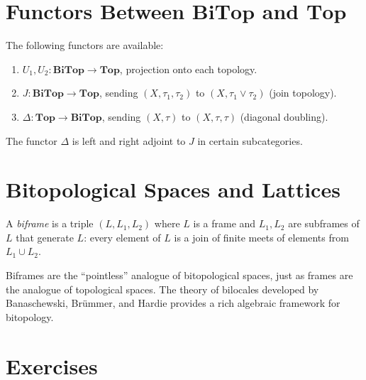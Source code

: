 \section{Functors Between $\mathbf{BiTop}$ and $\mathbf{Top}$}

\begin{proposition}
The following functors are available:
\begin{enumerate}
  \item $U_1, U_2\colon \mathbf{BiTop} \to \mathbf{Top}$, projection onto each topology.
  \item $J\colon \mathbf{BiTop} \to \mathbf{Top}$, sending $(X,\tau_1,\tau_2)$ to
    $(X, \tau_1 \vee \tau_2)$ (join topology).
  \item $\Delta\colon \mathbf{Top} \to \mathbf{BiTop}$, sending $(X,\tau)$ to
    $(X,\tau,\tau)$ (diagonal doubling).
\end{enumerate}
The functor $\Delta$ is left and right adjoint to $J$ in certain subcategories.
\end{proposition}

\section{Bitopological Spaces and Lattices}

\begin{definition}[Biframe]
A \emph{biframe} is a triple $(L, L_1, L_2)$ where $L$ is a frame and $L_1, L_2$ are
subframes of $L$ that generate $L$: every element of $L$ is a join of finite meets of
elements from $L_1 \cup L_2$.
\end{definition}

\begin{remark}
Biframes are the ``pointless'' analogue of bitopological spaces, just as frames are the
analogue of topological spaces. The theory of bilocales developed by Banaschewski,
Br\"ummer, and Hardie provides a rich algebraic framework for bitopology.
\end{remark}

\section{Exercises}

